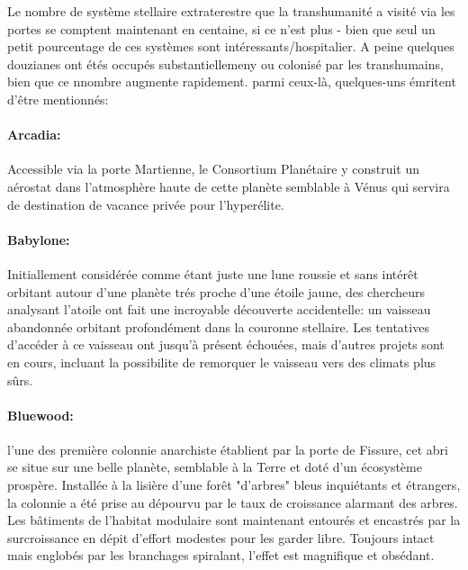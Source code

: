                                                                      Le nombre de système stellaire extraterestre que la transhumanité a visité via les portes se comptent maintenant en centaine, si ce n'est plus - bien que seul un petit pourcentage de ces systèmes sont intéressants/hospitalier. A peine quelques douzianes ont étés occupés substantiellemeny ou colonisé par les transhumains, bien que ce nnombre augmente rapidement. parmi ceux-là, quelques-uns émritent d'être mentionnés: 

                                                                     \paragraph{Arcadia:} \label{sec:arcadia} Accessible via la porte Martienne, le Consortium Planétaire y construit un aérostat dans l'atmosphère haute de cette planète semblable à Vénus qui servira de destination de vacance privée pour l'hyperélite. 

                                                                     \paragraph{Babylone:} \label{sec:babylon} Initiallement considérée comme étant juste une lune roussie et sans intérêt orbitant autour d'une planète trés proche d'une étoile jaune, des chercheurs analysant l'atoile ont fait une incroyable découverte accidentelle: un vaisseau abandonnée orbitant profondément dans la couronne stellaire. Les tentatives d'accéder à ce vaisseau ont jusqu'à présent échouées, mais d'autres projets sont en cours, incluant la possibilite de remorquer le vaisseau vers des climats plus sûrs. 

                                                                     \paragraph{Bluewood:} \label{sec:bluewood} l'une des première colonnie anarchiste établient par la porte de Fissure, cet abri se situe sur une belle planète, semblable à la Terre et doté d'un écosystème prospère. Installée à la lisière d'une forêt "d'arbres" bleus inquiétants et étrangers, la colonnie a été prise au dépourvu par le taux de croissance alarmant des arbres. Les bâtiments de l'habitat modulaire sont maintenant entourés et encastrés par la surcroissance en dépit d'effort modestes pour les garder libre. Toujours intact mais englobés par les branchages spiralant, l'effet est magnifique et obsédant. 

